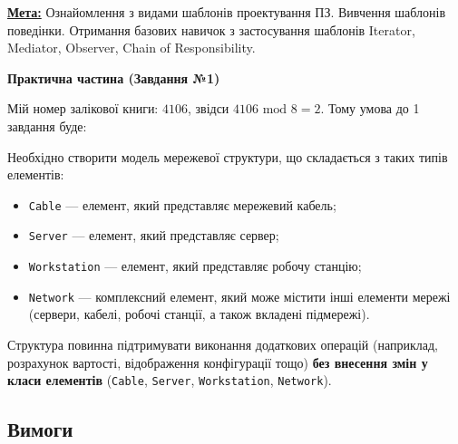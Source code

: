 \documentclass[12pt,a4paper]{article}
\begin{document}
    \textbf{\underline{Мета:}} Ознайомлення з видами шаблонів проектування ПЗ. Вивчення шаблонів
    поведінки. Отримання базових навичок з застосування шаблонів Iterator, Mediator, Observer,
    Chain of Responsibility.

    \begin{center} \textbf{\Large Практична частина (Завдання №1)} \end{center}

    \setlength{\parindent}{1.5em}

    Мій номер залікової книги: $4106$, звідси $4106 \text{ mod } 8 = 2$. Тому умова до 1 завдання буде:

    Необхідно створити модель мережевої структури, що складається з таких типів елементів:
    \begin{itemize}
        \item \texttt{Cable} --- елемент, який представляє мережевий кабель;
        \item \texttt{Server} --- елемент, який представляє сервер;
        \item \texttt{Workstation} --- елемент, який представляє робочу станцію;
        \item \texttt{Network} --- комплексний елемент, який може містити інші елементи мережі (сервери, кабелі, робочі станції, а також вкладені підмережі).
    \end{itemize}

    Структура повинна підтримувати виконання додаткових операцій (наприклад, розрахунок вартості, відображення конфігурації тощо) \textbf{без внесення змін у класи елементів} (\texttt{Cable}, \texttt{Server}, \texttt{Workstation}, \texttt{Network}).

    \subsection*{Вимоги}
\end{document}
